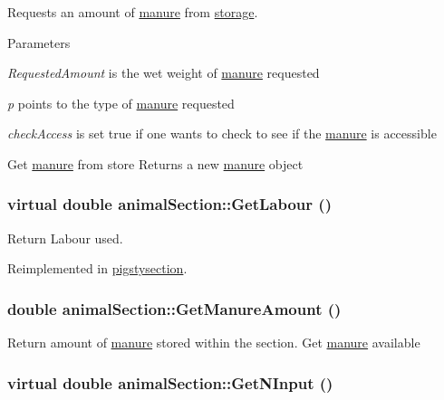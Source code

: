 Requests an amount of \hyperlink{classmanure}{manure} from \hyperlink{classstorage}{storage}. 
\begin{DoxyParams}{Parameters}
\item[{\em RequestedAmount}]is the wet weight of \hyperlink{classmanure}{manure} requested \item[{\em p}]points to the type of \hyperlink{classmanure}{manure} requested \item[{\em checkAccess}]is set true if one wants to check to see if the \hyperlink{classmanure}{manure} is accessible\end{DoxyParams}
Get \hyperlink{classmanure}{manure} from store Returns a new \hyperlink{classmanure}{manure} object \hypertarget{classanimal_section_acbe4ee2baee5364b2dbada0196449ebe}{
\subsubsection[{GetLabour}]{\setlength{\rightskip}{0pt plus 5cm}virtual double animalSection::GetLabour ()}}
\label{classanimal_section_acbe4ee2baee5364b2dbada0196449ebe}


Return Labour used. 

Reimplemented in \hyperlink{classpigstysection_a1a6111cae83f84e265366223576617c1}{pigstysection}.\hypertarget{classanimal_section_ab0b8b5f3e6b25020195e24cd71d56309}{
\subsubsection[{GetManureAmount}]{\setlength{\rightskip}{0pt plus 5cm}double animalSection::GetManureAmount ()}}
\label{classanimal_section_ab0b8b5f3e6b25020195e24cd71d56309}


Return amount of \hyperlink{classmanure}{manure} stored within the section. Get \hyperlink{classmanure}{manure} available \hypertarget{classanimal_section_a72672d9b6cef359ce6506826483858ed}{
\subsubsection[{GetNInput}]{\setlength{\rightskip}{0pt plus 5cm}virtual double animalSection::GetNInput ()}}
\label{classanimal_section_a72672d9b6cef359ce6506826483858ed}


